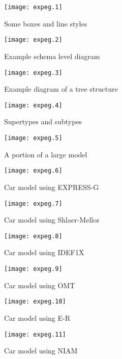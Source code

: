 \documentclass[11pt]{article}
\begin{document}
\begin{figure}
\centering
  \texttt{[image: expeg.1]}
\caption{Some boxes and line styles}
\end{figure}

\begin{figure}
\centering
  \texttt{[image: expeg.2]}
\caption{Example schema level diagram}
\end{figure}

\begin{figure}
\centering
  \texttt{[image: expeg.3]}
\caption{Example diagram of a tree structure}
\end{figure}

\begin{figure}
\centering
  \texttt{[image: expeg.4]}
\caption{Supertypes and subtypes}
\end{figure}

\begin{figure}
\centering
  \texttt{[image: expeg.5]}
\caption{A portion of a large model}
\end{figure}

\begin{figure}
\centering
  \texttt{[image: expeg.6]}
\caption{Car model using EXPRESS-G}
\end{figure}

\begin{figure}
\centering
  \texttt{[image: expeg.7]}
\caption{Car model using Shlaer-Mellor}
\end{figure}

\begin{figure}
\centering
  \texttt{[image: expeg.8]}
\caption{Car model using IDEF1X}
\end{figure}

\begin{figure}
\centering
  \texttt{[image: expeg.9]}
\caption{Car model using OMT}
\end{figure}

\begin{figure}
\centering
  \texttt{[image: expeg.10]}
\caption{Car model using E-R}
\end{figure}

\begin{figure}
\centering
  \texttt{[image: expeg.11]}
\caption{Car model using NIAM}
\end{figure}
\end{document}
